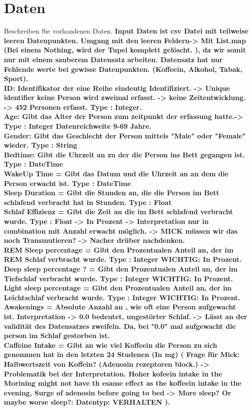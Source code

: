 \documentclass[usegeometry=true]{scrartcl}
\begin{document}
\section{Daten}
Beschreiben Sie vorhandenen Daten. 
\textbf {Input Daten ist csv Datei mit teilweise leeren Datenpunkten. Umgang mit den leeren Feldern-> Mit List.map (Bei einem Nothing, wird der Tupel komplett gelöscht. ), da wir somit nur mit einem sauberem Datensatz arbeiten. Datensatz hat nur Fehlende werte bei gewisse Datenpunkten. (Koffeein, Alkohol, Tabak, Sport).
\\ ID: Identifikator der eine Reihe eindeutig Identifiziert. -> Unique identifier keine Person wird zweimal erfasst. -> keine Zeitentwicklung. -> 452 Personen erfasst. Type : Integer.
\\ Age: Gibt das Alter der Person zum zeitpunkt der erfassung hatte.-> Type : Integer   Datenreichweite 9-69 Jahre.
\\ Gender: Gibt das Geschlecht der Person mittels "Male" oder "Female" wieder. Type : String
\\ Bedtime: Gibt die Uhrzeit an zu der die Person ins Bett gegangen ist. Type : DateTime
\\ WakeUp Time = Gibt das Datum und die Uhrzeit an an dem die Person erwacht ist.  Type : DateTime
\\ Sleep Duration = Gibt die Stunden an, die die Person im Bett schlafend verbracht hat in Stunden. Type : Float 
\\  Schlaf Effizienz = Gibt die Zeit an die im Bett schlafend verbracht wurde. Type : Float -> In Prozent -> Interpretation nur in combination mit Anzahl erwacht möglich. -> MICK müssen wir das noch Transmutieren? -> Nacher drüber nachdenken.
\\ REM Sleep percentage = Gibt den Prozentualen Anteil an, der im REM Schlaf verbracht wurde. Type : Integer WICHTIG: In Prozent. 
\\ Deep sleep percentage ? = Gibt den Prozentualen Anteil an, der im Tiefschlaf verbracht wurde. Type : Integer WICHTIG: In Prozent.
\\ Light sleep percentage = Gibt den Prozentualen Anteil an, der im Leichtschlaf verbracht wurde. Type : Integer WICHTIG: In Prozent.
\\ Awakenings = Absolute Anzahl an , wie oft eine Person aufgewacht ist. Interpretation -> 0.0 bedeutet, ungestörter Schlaf. -> Lässt an der validität des Datensatzes zweifeln. Da, bei "0.0" mal aufgewacht die person im Schlaf gestorben ist.
\\ Caffeine Intake = Gibt an wie viel Koffeein die Person zu sich genommen hat in den letzten 24 Studenen (In mg) ( Frage für Mick: Halbwertszeit von Koffein? (Adenosin rezeptoren block.) -> Problematik bei der Interpretation. Hoher kofeein intake in the Morining might not have th esame effect as the koffeein intake in the evening, Surge of adenosin before going to bed -> More sleep? Or maybe worse sleep?: Datentyp: VERHALTEN ). 
}
\end{document}
